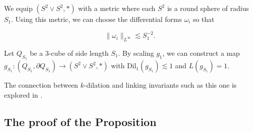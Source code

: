 \documentclass{amsart}
\newtheorem*{theorem 1}{Theorem 1}
\newtheorem*{theorem 2}{Theorem 2}
\newtheorem*{theorem 3}{Theorem 3}
\numberwithin{equation}{section}
\newcommand{\Dil}{\textrm{Dil}}
\begin{document}
We equip $(S^2 \vee S^2,  *)$ with a metric where each $S^2$ is a round sphere of radius $S_1$.   Using this metric,  we can choose the differential forms $\omega_i$ so that 

\begin{equation} \| \omega_i \|_{L^\infty} \lesssim S_1^{-2}.  \end{equation}

Let $Q_{S_1}$ be a 3-cube of side length $S_1$.   By scaling $g_1$,  we can construct a map $g_{S_1}: (Q_{S_1},  \partial Q_{S_1}) \rightarrow (S^2 \vee S^2,  *)$ with $\Dil_1(g_{S_1}) \lesssim 1$ and $L(g_{S_1}) = 1$.  

The connection between $k$-dilation and linking invariants such as this one is explored in \cite{GH}. 

\subsection{The proof of the Proposition}
\end{document}

